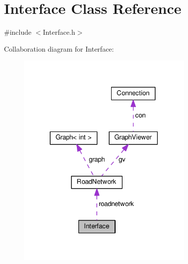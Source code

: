 \hypertarget{classInterface}{}\section{Interface Class Reference}
\label{classInterface}


{\ttfamily \#include $<$Interface.\+h$>$}



Collaboration diagram for Interface\+:\nopagebreak
\begin{figure}[H]
\begin{center}
\leavevmode
\includegraphics[width=242pt]{classInterface__coll__graph}
\end{center}
\end{figure}
